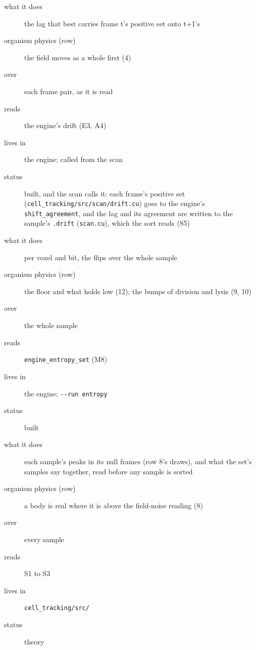 \begin{description}
\item[{what it does}] the lag that best carries frame t's positive set onto t+1's
\item[{organism physics (row)}] the field moves as a whole first (4)
\item[{over}] each frame pair, as it is read
\item[{reads}] the engine's drift (E3, A4)
\item[{lives in}] the engine; called from the scan
\item[{status}] built, and the scan calls it: each frame's positive set (\texttt{cell\_\allowbreak{}tracking/\allowbreak{}src/\allowbreak{}scan/\allowbreak{}drift.\allowbreak{}cu}) goes to the engine's \texttt{shift\_\allowbreak{}agreement}, and the lag and its agreement are written to the sample's \texttt{.\allowbreak{}drift} (\texttt{scan.\allowbreak{}cu}), which the sort reads (S5)
\end{description}

\begin{description}
\item[{what it does}] per voxel and bit, the flips over the whole sample
\item[{organism physics (row)}] the floor and what holds low (12); the bumps of division and lysis (9, 10)
\item[{over}] the whole sample
\item[{reads}] \texttt{engine\_\allowbreak{}entropy\_\allowbreak{}set} (M8)
\item[{lives in}] the engine; \texttt{-\allowbreak{}-\allowbreak{}run entropy}
\item[{status}] built
\end{description}

\begin{description}
\item[{what it does}] each sample's peaks in its null frames (row 8's draws), and what the set's samples say together, read before any sample is sorted
\item[{organism physics (row)}] a body is real where it is above the field-noise reading (8)
\item[{over}] every sample
\item[{reads}] S1 to S3
\item[{lives in}] \texttt{cell\_\allowbreak{}tracking/\allowbreak{}src/\allowbreak{}}
\item[{status}] theory
\end{description}

